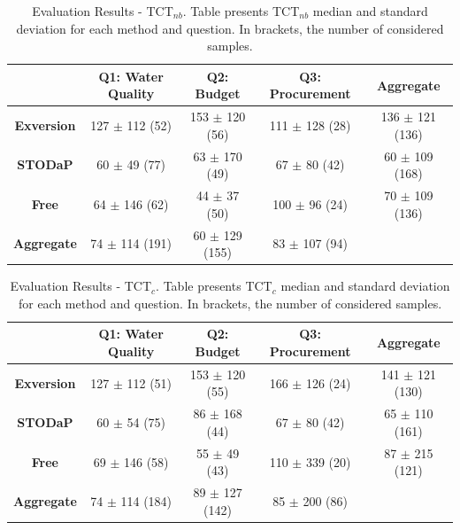 \begin{table}[h]
\ABNTEXfontereduzida
\centering
\caption[Evaluation Results - TCT$_{nb}$.]{Evaluation Results - TCT$_{nb}$. Table presents TCT$_{nb}$ median and standard deviation for each method and question. In brackets, the number of considered samples.}
\label{tab:results_TCT_nb}
\begin{tabular}{|>{\bfseries}c|c|c|c|c|}
\hline
 	& \bfseries{Q1: Water Quality} 	& \bfseries{Q2: Budget} 	& \bfseries{Q3: Procurement} 	& \bfseries{Aggregate} \\ \hline
Exversion 	& 127 $\pm$ 112 (52) 	& 153 $\pm$ 120 (56) 	& 111 $\pm$ 128 (28) 	& 136 $\pm$ 121 (136) \\ \hline
STODaP 	& 60 $\pm$ 49 (77) 	& 63 $\pm$ 170 (49) 	& 67 $\pm$ 80 (42) 	& 60 $\pm$ 109 (168) \\ \hline
Free 	& 64 $\pm$ 146 (62) 	& 44 $\pm$ 37 (50) 	& 100 $\pm$ 96 (24) 	& 70 $\pm$ 109 (136) \\ \hline
Aggregate 	& 74 $\pm$ 114 (191) 	& 60 $\pm$ 129 (155) 	& 83 $\pm$ 107 (94) 	& \\ \hline 
\end{tabular}
\end{table}

\begin{table}[h]
\ABNTEXfontereduzida
\centering
\caption[Evaluation Results - TCT$_{c}$.]{Evaluation Results - TCT$_{c}$. Table presents TCT$_{c}$ median and standard deviation for each method and question. In brackets, the number of considered samples.}
\label{tab:results_TCT_c}
\begin{tabular}{|>{\bfseries}c|c|c|c|c|}
\hline
 	& \bfseries{Q1: Water Quality} 	& \bfseries{Q2: Budget} 	& \bfseries{Q3: Procurement} 	& \bfseries{Aggregate} \\ \hline
Exversion 	& 127 $\pm$ 112 (51) 	& 153 $\pm$ 120 (55) 	& 166 $\pm$ 126 (24) 	& 141 $\pm$ 121 (130) \\ \hline
STODaP 	& 60 $\pm$ 54 (75) 	& 86 $\pm$ 168 (44) 	& 67 $\pm$ 80 (42) 	& 65 $\pm$ 110 (161) \\ \hline
Free 	& 69 $\pm$ 146 (58) 	& 55 $\pm$ 49 (43) 	& 110 $\pm$ 339 (20) 	& 87 $\pm$ 215 (121) \\ \hline
Aggregate 	& 74 $\pm$ 114 (184) 	& 89 $\pm$ 127 (142) 	& 85 $\pm$ 200 (86) 	& \\ \hline 
\end{tabular}
\end{table}

